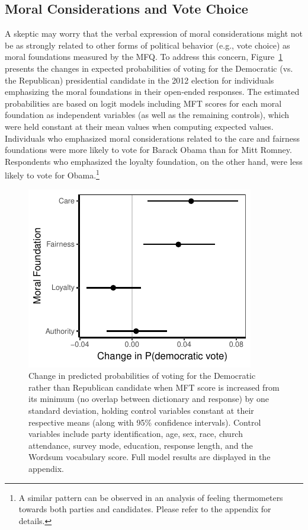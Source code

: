 \documentclass[12pt]{article}
\begin{document}
\subsection*{Moral Considerations and Vote Choice}

A skeptic may worry that the verbal expression of moral considerations might not be as strongly related to other forms of political behavior (e.g., vote choice) as moral foundations measured by the MFQ. To address this concern, Figure~\ref{fig:logit_vote} presents the changes in expected probabilities of voting for the Democratic (vs. the Republican) presidential candidate in the 2012 election for individuals emphasizing the moral foundations in their open-ended responses. The estimated probabilities are based on logit models including MFT scores for each moral foundation as independent variables (as well as  the remaining controls), which were held constant at their mean values when computing expected values. Individuals who emphasized moral considerations related to the care and fairness foundations were more likely to vote for Barack Obama than for Mitt Romney. Respondents who emphasized the loyalty foundation, on the other hand, were less likely to vote for Obama.\footnote{A similar pattern can be observed in an analysis of feeling thermometers towards both parties and candidates. Please refer to the appendix for details.}

\begin{figure}[ht]\centering
\includegraphics[scale=.9]{../calc/fig/logit_vote.pdf}
\caption{Change in predicted probabilities of voting for the Democratic rather than Republican candidate when MFT score is increased from its minimum (no overlap between dictionary and response) by one standard deviation, holding control variables constant at their respective means (along with 95\% confidence intervals). Control variables include party identification, age, sex, race, church attendance, survey mode, education, response length, and the Wordsum vocabulary score. Full model results are displayed in the appendix.
}\label{fig:logit_vote}
\end{figure}
\end{document}
